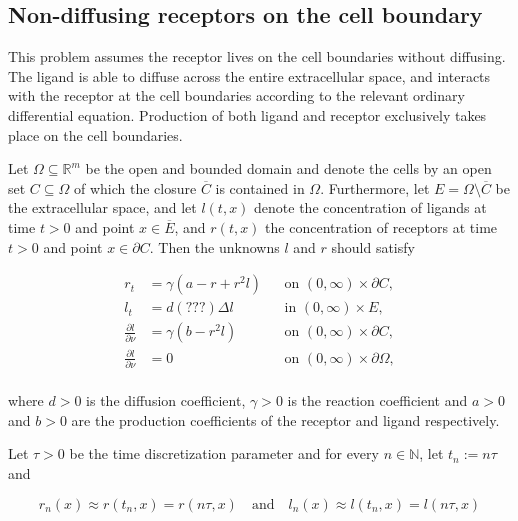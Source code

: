 \subsection{Non-diffusing receptors on the cell boundary}

This problem assumes the receptor lives on the cell boundaries without diffusing. The ligand is able to diffuse across the entire extracellular space, and interacts with the receptor at the cell boundaries according to the relevant ordinary differential equation. Production of both ligand and receptor exclusively takes place on the cell boundaries.

Let $\Omega \subseteq \mathbb{R}^{m}$ be the open and bounded domain and denote the cells by an open set $C \subseteq \Omega$ of which the closure $\overline{C}$ is contained in $\Omega$. Furthermore, let $E = \Omega \setminus \overline{C}$ be the extracellular space, and let $l(t, x)$ denote the concentration of ligands at time $t > 0$ and point $x \in \overline{E}$, and $r(t, x)$ the concentration of receptors at time $t > 0$ and point $x \in \partial C$. Then the unknowns $l$ and $r$ should satisfy

\begin{equation}
    \begin{aligned}
        r_t &= \gamma (a - r + r^{2}l) && \text{on } (0, \infty) \times \partial C, \\
        l_t &= d(???) \Delta l && \text{in } (0, \infty) \times E, \\
        \frac{\partial l}{\partial \nu} &= \gamma (b - r^{2}l) && \text{on } (0, \infty) \times \partial C, \\
        \frac{\partial l}{\partial \nu} &= 0 && \text{on } (0, \infty) \times \partial \Omega, \\
    \end{aligned}
\end{equation}

\noindent
where $d > 0$ is the diffusion coefficient, $\gamma > 0$ is the reaction coefficient and $a > 0$ and $b > 0$ are the production coefficients of the receptor and ligand respectively.

Let $\tau > 0$ be the time discretization parameter and for every $n \in \mathbb{N}$, let $t_n := n\tau$ and

\begin{equation}
    r_n(x) \approx r(t_n, x) = r(n\tau, x) \quad \text{and} \quad l_n(x) \approx l(t_n, x) = l(n\tau, x)
\end{equation}

